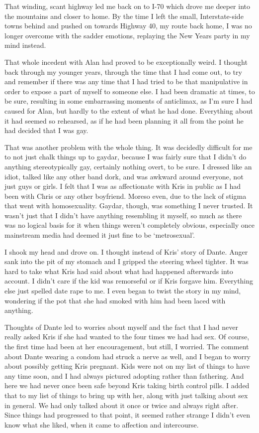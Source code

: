 That winding, scant highway led me back on to I-70 which drove me deeper into the mountains and closer to home.  By the time I left the small, Interstate-side towns behind and pushed on towards Highway 40, my route back home, I was no longer overcome with the sadder emotions, replaying the New Years party in my mind instead.

That whole incedent with Alan had proved to be exceptionally weird.  I thought back through my younger years, through the time that I had come out, to try and remember if there was any time that I had tried to be that manipulative in order to expose a part of myself to someone else.  I had been dramatic at times, to be sure, resulting in some embarrassing moments of anticlimax, as I'm sure I had caused for Alan, but hardly to the extent of what he had done.  Everything about it had seemed so rehearsed, as if he had been planning it all from the point he had decided that I was gay.

That was another problem with the whole thing.  It was decidedly difficult for me to not just chalk things up to gaydar, because I was fairly sure that I didn't do anything stereotypically gay, certainly nothing overt, to be sure.  I dressed like an idiot, talked like any other band dork, and was awkward around everyone, not just guys or girls.  I felt that I was as affectionate with Kris in public as I had been with Chris or any other boyfriend.  Moreso even, due to the lack of stigma that went with homosexuality.  Gaydar, though, was something I never trusted.  It wasn't just that I didn't have anything resembling it myself, so much as there was no logical basis for it when things weren't completely obvious, especially once mainstream media had deemed it just fine to be `metrosexual'.  

I shook my head and drove on.  I thought instead of Kris' story of Dante.  Anger sank into the pit of my stomach and I gripped the steering wheel tighter.  It was hard to take what Kris had said about what had happened afterwards into account.  I didn't care if the kid was remorseful or if Kris forgave him.  Everything else just spelled date rape to me.  I even began to twist the story in my mind, wondering if the pot that she had smoked with him had been laced with anything.

Thoughts of Dante led to worries about myself and the fact that I had never really asked Kris if she had wanted to the four times we had had sex.  Of course, the first time had been at her encouragement, but still, I worried.  The comment about Dante wearing a condom had struck a nerve as well, and I began to worry about possibly getting Kris pregnant.  Kids were not on my list of things to have any time soon, and I had always pictured adopting rather than fathering.  And here we had never once been safe beyond Kris taking birth control pills.  I added that to my list of things to bring up with her, along with just talking about sex in general.  We had only talked about it once or twice and always right after.  Since things had progressed to that point, it seemed rather strange I didn't even know what she liked, when it came to affection and intercourse.

